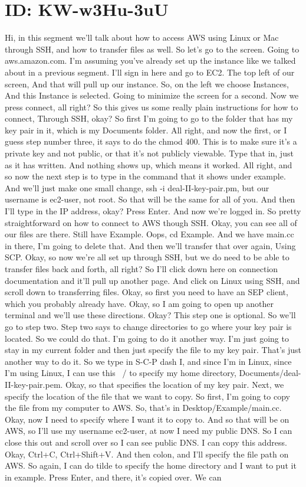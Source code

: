 \documentclass[10pt]{article}
\begin{document}
\section*{ID: KW-w3Hu-3uU}
Hi, in this segment we'll talk about how to access AWS using Linux or Mac through SSH, and how to transfer files as well. So let's go to the screen. Going to aws.amazon.com. I'm assuming you've already set up the instance like we talked about in a previous segment. I'll sign in here and go to EC2. The top left of our screen, And that will pull up our instance. So, on the left we choose Instances, And this Instance is selected. Going to minimize the screen for a second. Now we press connect, all right? So this gives us some really plain instructions for how to connect, Through SSH, okay? So first I'm going to go to the folder that has my key pair in it, which is my Documents folder. All right, and now the first, or I guess step number three, it says to do the chmod 400. This is to make sure it's a private key and not public, or that it's not publicly viewable. Type that in, just as it has written. And nothing shows up, which means it worked. All right, and so now the next step is to type in the command that it shows under example. And we'll just make one small change, ssh -i deal-II-key-pair.pm, but our username is ec2-user, not root. So that will be the same for all of you. And then I'll type in the IP address, okay? Press Enter. And now we're logged in. So pretty straightforward on how to connect to AWS though SSH. Okay, you can see all of our files are there. Still have Example. Oops, cd Example. And we have main.cc in there, I'm going to delete that. And then we'll transfer that over again, Using SCP. Okay, so now we're all set up through SSH, but we do need to be able to transfer files back and forth, all right? So I'll click down here on connection documentation and it'll pull up another page. And click on Linux using SSH, and scroll down to transferring files. Okay, so first you need to have an SEP client, which you probably already have. Okay, so I am going to open up another terminal and we'll use these directions. Okay? This step one is optional. So we'll go to step two. Step two says to change directories to go where your key pair is located. So we could do that. I'm going to do it another way. I'm just going to stay in my current folder and then just specify the file to my key pair. That's just another way to do it. So we type in S-C-P dash I, and since I'm in Linux, since I'm using Linux, I can use this ~/ to specify my home directory, Documents/deal-II-key-pair.pem. Okay, so that specifies the location of my key pair. Next, we specify the location of the file that we want to copy. So first, I'm going to copy the file from my computer to AWS. So, that's in Desktop/Example/main.cc. Okay, now I need to specify where I want it to copy to. And so that will be on AWS, so I'll use my username ec2-user, at now I need my public DNS. So I can close this out and scroll over so I can see public DNS. I can copy this address. Okay, Ctrl+C, Ctrl+Shift+V. And then colon, and I'll specify the file path on AWS. So again, I can do tilde to specify the home directory and I want to put it in example. Press Enter, and there, it's copied over. We can 
\end{document}
